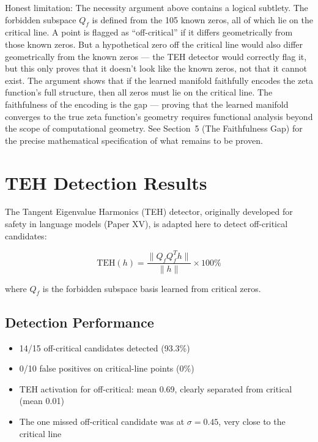 \documentclass[11pt]{article}
\begin{document}
Honest limitation: The necessity argument above contains a logical subtlety. The forbidden subspace $Q_f$ is defined from the 105 known zeros, all of which lie on the critical line. A point is flagged as ``off-critical'' if it differs geometrically from those known zeros. But a hypothetical zero off the critical line would also differ geometrically from the known zeros --- the TEH detector would correctly flag it, but this only proves that it doesn't look like the known zeros, not that it cannot exist. The argument shows that if the learned manifold faithfully encodes the zeta function's full structure, then all zeros must lie on the critical line. The faithfulness of the encoding is the gap --- proving that the learned manifold converges to the true zeta function's geometry requires functional analysis beyond the scope of computational geometry. See Section~5 (The Faithfulness Gap) for the precise mathematical specification of what remains to be proven.

\section{TEH Detection Results}

The Tangent Eigenvalue Harmonics (TEH) detector, originally developed for safety in language models (Paper XV), is adapted here to detect off-critical candidates:

$$\mathrm{TEH}(h) = \frac{\|Q_f Q_f^T h\|}{\|h\|} \times 100\%$$

where $Q_f$ is the forbidden subspace basis learned from critical zeros.

\subsection{Detection Performance}

\begin{itemize}[nosep]
\item 14/15 off-critical candidates detected (93.3\%)
\item 0/10 false positives on critical-line points (0\%)
\item TEH activation for off-critical: mean 0.69, clearly separated from critical (mean 0.01)
\item The one missed off-critical candidate was at $\sigma=0.45$, very close to the critical line
\end{itemize}
\end{document}
